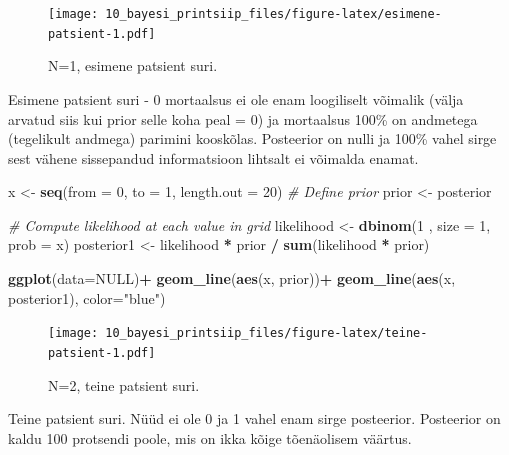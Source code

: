 \documentclass[]{book}
\newenvironment{Shaded}{\begin{snugshade}}{\end{snugshade}}
\newcommand{\KeywordTok}[1]{\textcolor[rgb]{0.13,0.29,0.53}{\textbf{#1}}}
\newcommand{\DataTypeTok}[1]{\textcolor[rgb]{0.13,0.29,0.53}{#1}}
\newcommand{\DecValTok}[1]{\textcolor[rgb]{0.00,0.00,0.81}{#1}}
\newcommand{\StringTok}[1]{\textcolor[rgb]{0.31,0.60,0.02}{#1}}
\newcommand{\CommentTok}[1]{\textcolor[rgb]{0.56,0.35,0.01}{\textit{#1}}}
\newcommand{\OtherTok}[1]{\textcolor[rgb]{0.56,0.35,0.01}{#1}}
\newcommand{\OperatorTok}[1]{\textcolor[rgb]{0.81,0.36,0.00}{\textbf{#1}}}
\newcommand{\NormalTok}[1]{#1}
\begin{document}
\begin{figure}
\centering
\texttt{[image: 10\_bayesi\_printsiip\_files/figure-latex/esimene-patsient-1.pdf]}
\caption{\label{fig:esimene-patsient}N=1, esimene patsient suri.}
\end{figure}

Esimene patsient suri - 0 mortaalsus ei ole enam loogiliselt võimalik
(välja arvatud siis kui prior selle koha peal = 0) ja mortaalsus 100\%
on andmetega (tegelikult andmega) parimini kooskõlas. Posteerior on
nulli ja 100\% vahel sirge sest vähene sissepandud informatsioon
lihtsalt ei võimalda enamat.



\begin{Shaded}
\begin{Highlighting}[]
\NormalTok{x <-}\StringTok{ }\KeywordTok{seq}\NormalTok{(}\DataTypeTok{from =} \DecValTok{0}\NormalTok{, }\DataTypeTok{to =} \DecValTok{1}\NormalTok{, }\DataTypeTok{length.out =} \DecValTok{20}\NormalTok{)}
\CommentTok{# Define prior}
\NormalTok{prior <-}\StringTok{ }\NormalTok{posterior}

\CommentTok{# Compute likelihood at each value in grid}
\NormalTok{likelihood <-}\StringTok{ }\KeywordTok{dbinom}\NormalTok{(}\DecValTok{1}\NormalTok{ , }\DataTypeTok{size =} \DecValTok{1}\NormalTok{, }\DataTypeTok{prob =}\NormalTok{ x)}
\NormalTok{posterior1 <-}\StringTok{ }\NormalTok{likelihood }\OperatorTok{*}\StringTok{ }\NormalTok{prior }\OperatorTok{/}\StringTok{ }\KeywordTok{sum}\NormalTok{(likelihood }\OperatorTok{*}\StringTok{ }\NormalTok{prior)}

\KeywordTok{ggplot}\NormalTok{(}\DataTypeTok{data=}\OtherTok{NULL}\NormalTok{)}\OperatorTok{+}
\StringTok{  }\KeywordTok{geom_line}\NormalTok{(}\KeywordTok{aes}\NormalTok{(x, prior))}\OperatorTok{+}
\StringTok{  }\KeywordTok{geom_line}\NormalTok{(}\KeywordTok{aes}\NormalTok{(x, posterior1), }\DataTypeTok{color=}\StringTok{"blue"}\NormalTok{)}
\end{Highlighting}
\end{Shaded}

\begin{figure}
\centering
\texttt{[image: 10\_bayesi\_printsiip\_files/figure-latex/teine-patsient-1.pdf]}
\caption{\label{fig:teine-patsient}N=2, teine patsient suri.}
\end{figure}

Teine patsient suri. Nüüd ei ole 0 ja 1 vahel enam sirge posteerior.
Posteerior on kaldu 100 protsendi poole, mis on ikka kõige tõenäolisem
väärtus.
\end{document}
